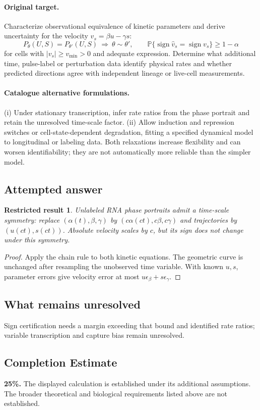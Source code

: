 \documentclass[11pt]{article}
\newcommand{\Prob}{\mathbb P}
\providecommand{\Prob}{\mathbb P}
\newtheorem{attemptresult}{Restricted result}[section]
\begin{document}
\paragraph{Original target.}
Characterize observational equivalence of kinetic parameters and derive uncertainty for the velocity $v_s=\beta u-\gamma s$:
\[P_\theta(U,S)=P_{\theta'}(U,S)\ \Longrightarrow\ \theta\sim\theta',\qquad \Prob\{\operatorname{sign}\widehat v_s=\operatorname{sign}v_s\}\ge1-\alpha\]
for cells with $|v_s|\ge v_{\min}>0$ and adequate expression. Determine what additional time, pulse-label or perturbation data identify physical rates and whether predicted directions agree with independent lineage or live-cell measurements.
\paragraph{Catalogue alternative formulations.}
(i) Under stationary transcription, infer rate ratios from the phase portrait and retain the unresolved time-scale factor. (ii) Allow induction and repression switches or cell-state-dependent degradation, fitting a specified dynamical model to longitudinal or labeling data. Both relaxations increase flexibility and can worsen identifiability; they are not automatically more reliable than the simpler model.
\subsection{Attempted answer}
\begin{attemptresult}
Unlabeled RNA phase portraits admit a time-scale symmetry: replace $(\alpha(t),\beta,\gamma)$ by $(c\alpha(ct),c\beta,c\gamma)$ and trajectories by $(u(ct),s(ct))$. Absolute velocity scales by $c$, but its sign does not change under this symmetry.
\end{attemptresult}
\begin{proof}
Apply the chain rule to both kinetic equations. The geometric curve is unchanged after resampling the unobserved time variable. With known $u,s$, parameter errors give velocity error at most $u\epsilon_\beta+s\epsilon_\gamma$.
\end{proof}
\subsection{What remains unresolved}
Sign certification needs a margin exceeding that bound and identified rate ratios; variable transcription and capture bias remain unresolved.
\subsection{Completion Estimate}
\textbf{25\%.} The displayed calculation is established under its additional assumptions. The broader theoretical and biological requirements listed above are not established.
\end{document}
